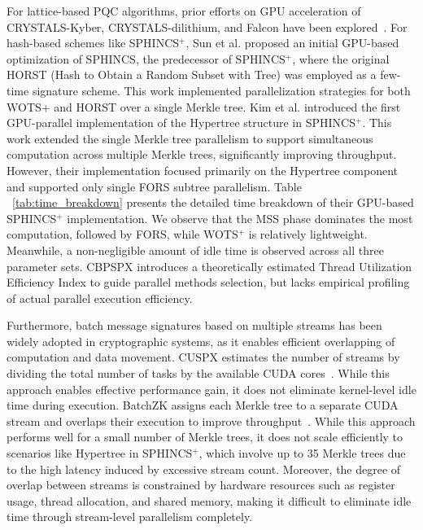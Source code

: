 \documentclass[10pt,conference]{IEEEtran}
\begin{document}
For lattice-based PQC algorithms, prior efforts on GPU acceleration of CRYSTALS-Kyber, CRYSTALS-dilithium, and Falcon have been explored~\cite{10.1007/978-3-031-17143-7_25, shen2024high, cmc.2023.033910}. For hash-based schemes like SPHINCS$^+$, Sun et al. \cite{9095410} proposed an initial GPU-based optimization of SPHINCS, the predecessor of SPHINCS$^+$, where the original HORST (Hash to Obtain a Random Subset with Tree) was employed as a few-time signature scheme. This work implemented parallelization strategies for both WOTS+ and HORST over a single Merkle tree. Kim et al. \cite{kim2024parallel} introduced the first GPU-parallel implementation of the Hypertree structure in SPHINCS$^+$. This work extended the single Merkle tree parallelism to support simultaneous computation across multiple Merkle trees, significantly improving throughput. However, their implementation focused primarily on the Hypertree component and supported only single FORS subtree parallelism. Table ~\ref{tab:time_breakdown} presents the detailed time breakdown of their GPU-based SPHINCS$^+$ implementation. We observe that the MSS phase dominates the most computation, followed by FORS, while WOTS$^+$ is relatively lightweight. Meanwhile, a non-negligible amount of idle time is observed across all three parameter sets. CBPSPX introduces a theoretically estimated Thread Utilization Efficiency Index to guide parallel methods selection, but lacks empirical profiling of actual parallel execution efficiency\cite{11068129}.




Furthermore, batch message signatures based on multiple streams has been widely adopted in cryptographic systems, as it enables efficient overlapping of computation and data movement. CUSPX estimates the number of streams by dividing the total number of tasks by the available CUDA cores~\cite{10677363}. While this approach enables effective performance gain, it does not eliminate kernel-level idle time during execution. BatchZK assigns each Merkle tree to a separate CUDA stream and overlaps their execution to improve throughput~\cite{10.1145/3669940.3707270}. While this approach performs well for a small number of Merkle trees, it does not scale efficiently to scenarios like Hypertree in SPHINCS$^+$, which involve up to 35 Merkle trees due to the high latency induced by excessive stream count. Moreover, the degree of overlap between streams is constrained by hardware resources such as register usage, thread allocation, and shared memory, making it difficult to eliminate idle time through stream-level parallelism completely.
\end{document}
